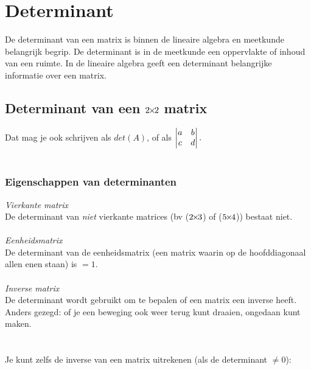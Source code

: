 \chapter{Determinant}
\label{chap: Determinant}
De determinant van een matrix is binnen de lineaire algebra en meetkunde belangrijk begrip. De determinant is in de meetkunde een oppervlakte of inhoud van een ruimte. In de lineaire algebra geeft een determinant belangrijke informatie over een matrix.
\section{Determinant van een $2{\mkern-2mu\times\mkern-2mu}2$ matrix}

Dat mag je ook schrijven als \quad $det(A)$, \quad of als \quad $  \begin{vmatrix} a & b \\ c & d \end{vmatrix}.  $ \\ \\

\subsection{Eigenschappen van determinanten}
\textit{Vierkante matrix}\\
De determinant van \textit{niet} vierkante matrices (bv ($2{\mkern-2mu\times\mkern-2mu}3$) of ($5{\mkern-2mu\times\mkern-2mu}4$)) bestaat niet. \\ \\       
\textit{Eenheidsmatrix}\\
De determinant van de eenheidsmatrix (een matrix waarin op de hoofddiagonaal allen enen staan) is $= 1$. \\ \\
\textit{Inverse matrix}\\
De determinant wordt gebruikt om te bepalen of een matrix een inverse heeft. Anders gezegd: of je een beweging ook weer terug kunt draaien, ongedaan kunt maken. \\ \\
 \\
Je kunt zelfs de inverse van een matrix uitrekenen (als de determinant $\ne 0 $):\\

